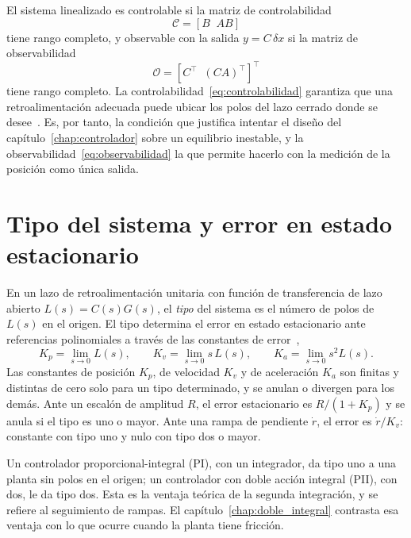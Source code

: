 El sistema linealizado es controlable si la matriz de controlabilidad
\begin{equation}
\mathcal{C}=[B\;\; AB]
\label{eq:controlabilidad}
\end{equation}
tiene rango completo, y observable con la salida $y=C\,\delta x$ si la matriz de observabilidad
\begin{equation}
\mathcal{O}=[C^\top\;\; (CA)^\top]^\top
\label{eq:observabilidad}
\end{equation}
tiene rango completo. La controlabilidad~\eqref{eq:controlabilidad} garantiza que una retroalimentación adecuada puede ubicar los polos del lazo cerrado donde se desee~\cite{ogata}. Es, por tanto, la condición que justifica intentar el diseño del capítulo~\ref{chap:controlador} sobre un equilibrio inestable, y la observabilidad~\eqref{eq:observabilidad} la que permite hacerlo con la medición de la posición como única salida.

\section{Tipo del sistema y error en estado estacionario}\label{sec:fund_tipo}

En un lazo de retroalimentación unitaria con función de transferencia de lazo abierto $L(s)=C(s)G(s)$, el \emph{tipo} del sistema es el número de polos de $L(s)$ en el origen. El tipo determina el error en estado estacionario ante referencias polinomiales a través de las constantes de error~\cite{ogata,gene},
\begin{equation}
K_p=\lim_{s\to0}L(s), \qquad K_v=\lim_{s\to0}s\,L(s), \qquad K_a=\lim_{s\to0}s^2L(s) .
\label{eq:constantes_error}
\end{equation}
Las constantes de posición $K_p$, de velocidad $K_v$ y de aceleración $K_a$ son finitas y distintas de cero solo para un tipo determinado, y se anulan o divergen para los demás. Ante un escalón de amplitud $R$, el error estacionario es $R/(1+K_p)$ y se anula si el tipo es uno o mayor. Ante una rampa de pendiente $\dot r$, el error es $\dot r/K_v$: constante con tipo uno y nulo con tipo dos o mayor.

Un controlador proporcional-integral (PI), con un integrador, da tipo uno a una planta sin polos en el origen; un controlador con doble acción integral (PII), con dos, le da tipo dos. Esta es la ventaja teórica de la segunda integración, y se refiere al seguimiento de rampas. El capítulo~\ref{chap:doble_integral} contrasta esa ventaja con lo que ocurre cuando la planta tiene fricción.

